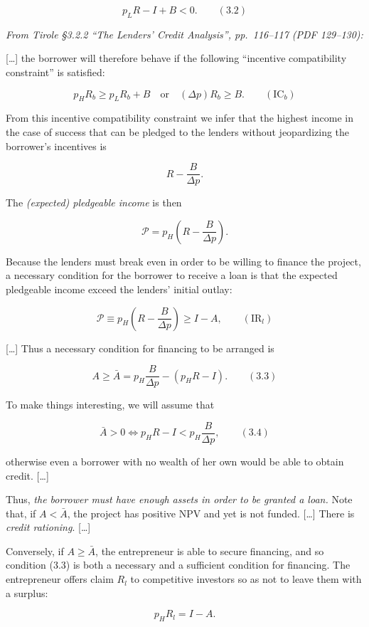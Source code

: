 \documentclass[11pt,a4paper]{article}
\begin{document}
\[p_L R - I + B < 0. \qquad (3.2)\]

\emph{From Tirole §3.2.2 ``The Lenders' Credit Analysis'', pp.~116--117 (PDF 129--130):}

{[}\ldots{]} the borrower will therefore behave if the following ``incentive compatibility
constraint'' is satisfied:

\[p_H R_b \geqslant p_L R_b + B \quad \text{or} \quad (\Delta p) R_b \geqslant B. \qquad (\text{IC}_b)\]

From this incentive compatibility constraint we infer that the highest income in the case of success
that can be pledged to the lenders without jeopardizing the borrower's incentives is

\[R - \frac{B}{\Delta p}.\]

The \emph{(expected) pledgeable income} is then

\[\mathcal{P} = p_H\left(R - \frac{B}{\Delta p}\right).\]

Because the lenders must break even in order to be willing to finance the project, a necessary
condition for the borrower to receive a loan is that the expected pledgeable income exceed the
lenders' initial outlay:

\[\mathcal{P} \equiv p_H\left(R - \frac{B}{\Delta p}\right) \geqslant I - A, \qquad (\text{IR}_l)\]

{[}\ldots{]} Thus a necessary condition for financing to be arranged is

\[A \geqslant \bar A = p_H \frac{B}{\Delta p} - (p_H R - I). \qquad (3.3)\]

To make things interesting, we will assume that

\[\bar A > 0 \iff p_H R - I < p_H \frac{B}{\Delta p}, \qquad (3.4)\]

otherwise even a borrower with no wealth of her own would be able to obtain credit. {[}\ldots{]}

Thus, \emph{the borrower must have enough assets in order to be granted a loan.} Note that, if
\(A < \bar A\), the project has positive NPV and yet is not funded. {[}\ldots{]} There is
\emph{credit rationing}. {[}\ldots{]}

Conversely, if \(A \geqslant \bar A\), the entrepreneur is able to secure financing, and so
condition (3.3) is both a necessary and a sufficient condition for financing. The entrepreneur
offers claim \(R_l\) to competitive investors so as not to leave them with a surplus:

\[p_H R_l = I - A.\]
\end{document}
